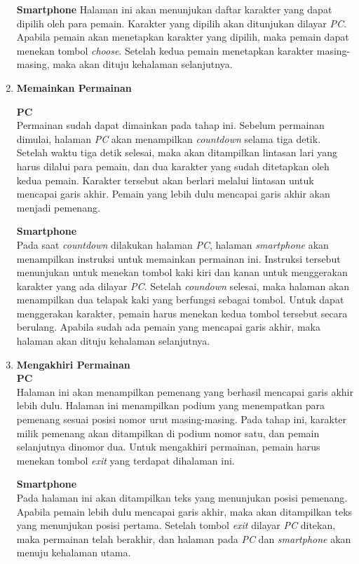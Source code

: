 \begin{enumerate}
	\textbf{Smartphone}
	Halaman ini akan menunjukan daftar karakter yang dapat dipilih oleh para pemain. Karakter yang dipilih akan ditunjukan dilayar \textit{PC}. Apabila pemain akan menetapkan karakter yang dipilih, maka pemain dapat menekan tombol \textit{choose}. Setelah kedua pemain menetapkan karakter masing-masing, maka akan dituju kehalaman selanjutnya.
	
	\item \textbf{Memainkan Permainan}
	
	\textbf{PC} \\
	Permainan sudah dapat dimainkan pada tahap ini. Sebelum permainan dimulai, halaman \textit{PC} akan menampilkan \textit{countdown} selama tiga detik. Setelah waktu tiga detik selesai, maka akan ditampilkan lintasan lari yang harus dilalui para pemain, dan dua karakter yang sudah ditetapkan oleh kedua pemain. Karakter tersebut akan berlari melalui lintasan untuk mencapai garis akhir. Pemain yang lebih dulu mencapai garis akhir akan menjadi pemenang.
	
	\textbf{Smartphone} \\
	Pada saat \textit{countdown} dilakukan halaman \textit{PC}, halaman \textit{smartphone} akan menampilkan instruksi untuk memainkan permainan ini. Instruksi tersebut menunjukan untuk menekan tombol kaki kiri dan kanan untuk menggerakan karakter yang ada dilayar \textit{PC}. Setelah \textit{coundown} selesai, maka halaman akan menampilkan dua telapak kaki yang berfungsi sebagai tombol. Untuk dapat menggerakan karakter, pemain harus menekan kedua tombol tersebut secara berulang. Apabila sudah ada pemain yang mencapai garis akhir, maka halaman akan dituju kehalaman selanjutnya.
	
	\item \textbf{Mengakhiri Permainan} \\
	
	\textbf{PC} \\
	Halaman ini akan menampilkan pemenang yang berhasil mencapai garis akhir lebih dulu. Halaman ini menampilkan podium yang menempatkan para pemenang sesuai posisi nomor urut masing-masing. Pada tahap ini, karakter milik pemenang akan ditampilkan di podium nomor satu, dan pemain selanjutnya dinomor dua. Untuk mengakhiri permainan, pemain harus menekan tombol \textit{exit} yang terdapat dihalaman ini.
	
	\textbf{Smartphone} \\
	Pada halaman ini akan ditampilkan teks yang menunjukan posisi pemenang. Apabila pemain lebih dulu mencapai garis akhir, maka akan ditampilkan teks yang menunjukan posisi pertama. Setelah tombol \textit{exit} dilayar \textit{PC} ditekan, maka permainan telah berakhir, dan halaman pada \textit{PC} dan \textit{smartphone} akan menuju kehalaman utama.
	
\end{enumerate}

